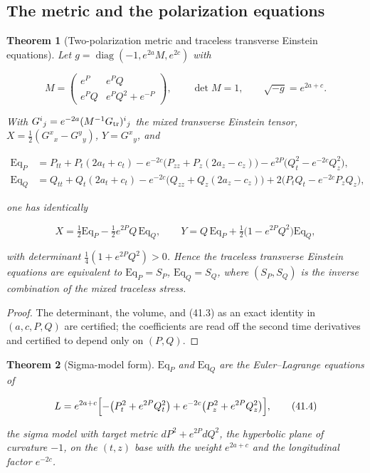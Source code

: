 \documentclass[11pt]{article}
\newtheorem{theorem}{Theorem}[section]
\theoremstyle{remark}
\begin{document}
\subsection{The metric and the polarization equations}

\begin{theorem}[Two-polarization metric and traceless transverse Einstein equations]
\label{thm:v20v38-metric}
Let \(g=\operatorname{diag}(-1,e^{2a}M,e^{2c})\) with

\[
 M=\begin{pmatrix}e^{P}&e^{P}Q\\ e^{P}Q&e^{P}Q^2+e^{-P}\end{pmatrix},\qquad \det M=1,\qquad \sqrt{-g}=e^{2a+c}.
                                                                    \tag{41.1}
\]

With \(G^i{}_j=e^{-2a}(M^{-1}G_{\rm tr})^i{}_j\) the mixed transverse
Einstein tensor, \(X=\tfrac12(G^x{}_x-G^y{}_y)\), \(Y=G^x{}_y\), and

\[
\begin{aligned}
 \mathrm{Eq}_P&=P_{tt}+P_t(2a_t+c_t)-e^{-2c}\bigl(P_{zz}+P_z(2a_z-c_z)\bigr)-e^{2P}\bigl(Q_t^2-e^{-2c}Q_z^2\bigr),\\
 \mathrm{Eq}_Q&=Q_{tt}+Q_t(2a_t+c_t)-e^{-2c}\bigl(Q_{zz}+Q_z(2a_z-c_z)\bigr)+2\bigl(P_tQ_t-e^{-2c}P_zQ_z\bigr),
\end{aligned}                                                          \tag{41.2}
\]

one has identically

\[
 X=\tfrac12\mathrm{Eq}_P-\tfrac12e^{2P}Q\,\mathrm{Eq}_Q,\qquad
 Y=Q\,\mathrm{Eq}_P+\tfrac12\bigl(1-e^{2P}Q^2\bigr)\mathrm{Eq}_Q,        \tag{41.3}
\]

with determinant \(\tfrac14(1+e^{2P}Q^2)>0\).  Hence the traceless
transverse Einstein equations are equivalent to
\(\mathrm{Eq}_P=S_P\), \(\mathrm{Eq}_Q=S_Q\), where \((S_P,S_Q)\) is the
inverse combination of the mixed traceless stress.
\end{theorem}

\begin{proof}
The determinant, the volume, and (41.3) as an exact identity in
\((a,c,P,Q)\) are certified; the coefficients are read off the second
time derivatives and certified to depend only on \((P,Q)\).
\end{proof}

\begin{theorem}[Sigma-model form]
\label{thm:v20v38-sigma}
\(\mathrm{Eq}_P\) and \(\mathrm{Eq}_Q\) are the Euler--Lagrange
equations of

\[
 L=e^{2a+c}\Bigl[-\bigl(P_t^2+e^{2P}Q_t^2\bigr)+e^{-2c}\bigl(P_z^2+e^{2P}Q_z^2\bigr)\Bigr],
                                                                    \tag{41.4}
\]

the sigma model with target metric \(dP^2+e^{2P}dQ^2\), the
hyperbolic plane of curvature \(-1\), on the \((t,z)\) base with the
weight \(e^{2a+c}\) and the longitudinal factor \(e^{-2c}\).
\end{theorem}
\end{document}
